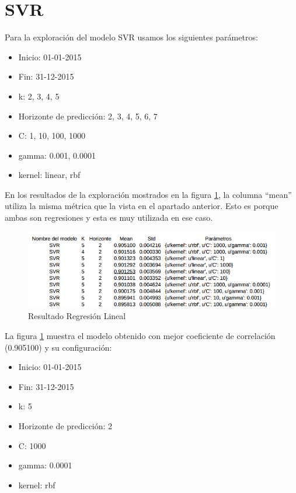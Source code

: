 \section{SVR}
\label{makereference7.2}

Para la exploración del modelo SVR usamos los siguientes parámetros:

\begin{itemize}
\item Inicio: 01-01-2015
\item Fin: 31-12-2015
\item k: 2, 3, 4, 5
\item Horizonte de predicción: 2, 3, 4, 5, 6, 7
\item C: 1, 10, 100, 1000
\item gamma: 0.001, 0.0001
\item kernel: linear, rbf 
\end{itemize}

En los resultados de la exploración mostrados en la figura \ref{resultado_svr}, la columna ``mean'' utiliza la misma métrica que la vista en el apartado anterior. Esto es porque ambas son regresiones y esta es muy utilizada en ese caso.

\begin{figure}[htb]
	\begin{center}
		\includegraphics[width=14cm]{figures/resultado_svr.png}
		\caption{Resultado Regresión Lineal \label{resultado_svr}}
	\end{center}
\end{figure}

La figura \ref{resultado_svr} muestra el modelo obtenido con mejor coeficiente de correlación (0.905100) y su configuración:

\begin{itemize}
\item Inicio: 01-01-2015
\item Fin: 31-12-2015
\item k: 5
\item Horizonte de predicción: 2
\item C: 1000
\item gamma: 0.0001
\item kernel: rbf 
\end{itemize}

